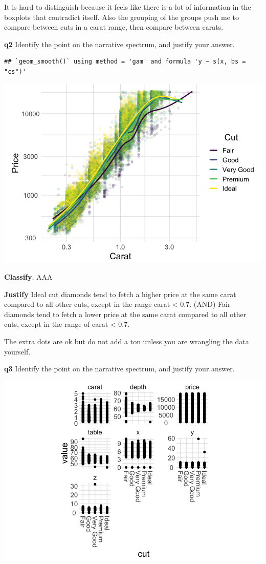 \documentclass[
]{article}
\begin{document}
It is hard to distinguish because it feels like there is a lot of
information in the boxplots that contradict itself. Also the grouping of
the groups push me to compare between cuts in a carat range, then
compare between carats.

\newpage

\textbf{q2} Identify the point on the narrative spectrum, and justify
your answer.

\begin{verbatim}
## `geom_smooth()` using method = 'gam' and formula 'y ~ s(x, bs = "cs")'
\end{verbatim}

\includegraphics{d20-e-comm01-story-basics-assignment_files/figure-latex/q2-vis-1.png}

\textbf{Classify}: AAA

\textbf{Justify} Ideal cut diamonds tend to fetch a higher price at the
same carat compared to all other cuts, except in the range carat
\textless{} 0.7. (AND) Fair diamonds tend to fetch a lower price at the
same carat compared to all other cuts, except in the range of carat
\textless{} 0.7.

The extra dots are ok but do not add a ton unless you are wrangling the
data yourself.

\newpage

\textbf{q3} Identify the point on the narrative spectrum, and justify
your answer.

\includegraphics{d20-e-comm01-story-basics-assignment_files/figure-latex/q3-vis-1.png}
\end{document}
